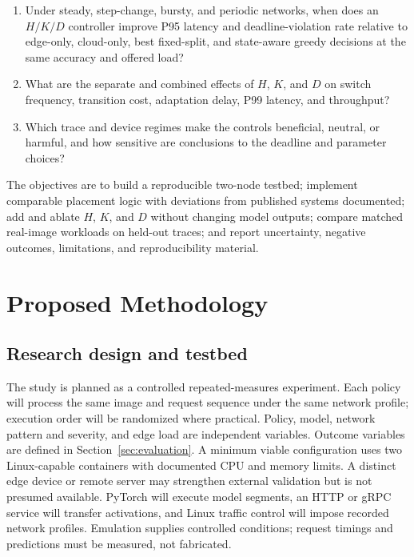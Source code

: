 \documentclass[10pt,a4paper,twocolumn]{article}
\begin{document}
\begin{enumerate}[label=\textbf{RQ\arabic*.}]
\item Under steady, step-change, bursty, and periodic networks, when does an $H/K/D$ controller improve P95 latency and deadline-violation rate relative to edge-only, cloud-only, best fixed-split, and state-aware greedy decisions at the same accuracy and offered load?
\item What are the separate and combined effects of $H$, $K$, and $D$ on switch frequency, transition cost, adaptation delay, P99 latency, and throughput?
\item Which trace and device regimes make the controls beneficial, neutral, or harmful, and how sensitive are conclusions to the deadline and parameter choices?
\end{enumerate}

The objectives are to build a reproducible two-node testbed; implement comparable placement logic with deviations from published systems documented; add and ablate $H$, $K$, and $D$ without changing model outputs; compare matched real-image workloads on held-out traces; and report uncertainty, negative outcomes, limitations, and reproducibility material.

\section{Proposed Methodology}
\subsection{Research design and testbed}
The study is planned as a controlled repeated-measures experiment. Each policy will process the same image and request sequence under the same network profile; execution order will be randomized where practical. Policy, model, network pattern and severity, and edge load are independent variables. Outcome variables are defined in Section~\ref{sec:evaluation}. A minimum viable configuration uses two Linux-capable containers with documented CPU and memory limits. A distinct edge device or remote server may strengthen external validation but is not presumed available. PyTorch will execute model segments, an HTTP or gRPC service will transfer activations, and Linux traffic control will impose recorded network profiles. Emulation supplies controlled conditions; request timings and predictions must be measured, not fabricated.
\end{document}
